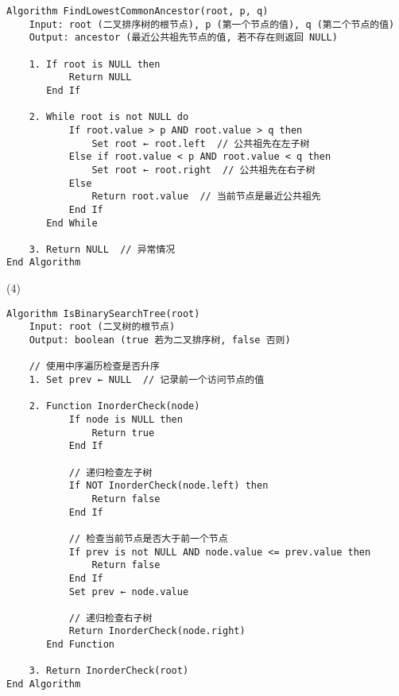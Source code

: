 \begin{lstlisting}
Algorithm FindLowestCommonAncestor(root, p, q)
    Input: root (二叉排序树的根节点), p (第一个节点的值), q (第二个节点的值)
    Output: ancestor (最近公共祖先节点的值, 若不存在则返回 NULL)

    1. If root is NULL then
           Return NULL
       End If

    2. While root is not NULL do
           If root.value > p AND root.value > q then
               Set root ← root.left  // 公共祖先在左子树
           Else if root.value < p AND root.value < q then
               Set root ← root.right  // 公共祖先在右子树
           Else
               Return root.value  // 当前节点是最近公共祖先
           End If
       End While

    3. Return NULL  // 异常情况
End Algorithm
\end{lstlisting}
(4)

\begin{lstlisting}
Algorithm IsBinarySearchTree(root)
    Input: root (二叉树的根节点)
    Output: boolean (true 若为二叉排序树, false 否则)

    // 使用中序遍历检查是否升序
    1. Set prev ← NULL  // 记录前一个访问节点的值

    2. Function InorderCheck(node)
           If node is NULL then
               Return true
           End If

           // 递归检查左子树
           If NOT InorderCheck(node.left) then
               Return false
           End If

           // 检查当前节点是否大于前一个节点
           If prev is not NULL AND node.value <= prev.value then
               Return false
           End If
           Set prev ← node.value

           // 递归检查右子树
           Return InorderCheck(node.right)
       End Function

    3. Return InorderCheck(root)
End Algorithm
\end{lstlisting}